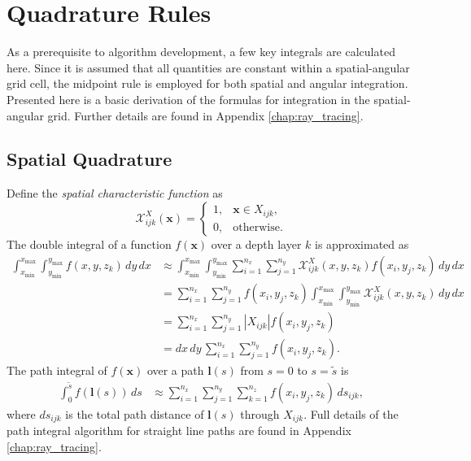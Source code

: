 \documentclass[ms,cpyr,lof,lot]{uathesis}
\newcommand\xmin{{x_{\min}}}
\newcommand\xmax{{x_{\max}}}
\newcommand\ymin{{y_{\min}}}
\newcommand\ymax{{y_{\max}}}
\newcommand\abs[1]{\left| #1 \right|}
\renewcommand\vec\bm
\providecommand{\DIFaddend}{} %
\DeclareRobustCommand{\DIFaddend}{\DIFOaddend \let\includegraphics\DIFOincludegraphics} %
\begin{document}
\DIFaddend \section{Quadrature Rules}
As a prerequisite to algorithm development, a few key integrals are calculated here.
Since it is assumed that all quantities are constant within a spatial-angular grid cell,
the midpoint rule is employed for both spatial and angular integration.
Presented here is a basic derivation of the formulas for integration in the spatial-angular grid.
Further details are found in Appendix \ref{chap:ray_tracing}.

\subsection{Spatial Quadrature}
Define the \textit{spatial characteristic function} as
\begin{equation*}
  \mathcal{X}^X_{ijk}(\vec{x}) = \begin{cases}
    1, & \vec{x} \in X_{ijk}, \\
    0, & \mbox{otherwise}.
  \end{cases}
\end{equation*}
The double integral of a function $f(\vec{x})$ over a depth layer $k$ is approximated as
\begin{align*}
  \int_\xmin^\xmax\int_\ymin^\ymax f(x, y, z_k)\, dy\, dx &\approx \int_\xmin^\xmax \int_\ymin^\ymax \sum_{i=1}^{n_x}\sum_{j=1}^{n_y} \mathcal{X}^X_{ijk}(x,y,z_k) f(x_i, y_j, z_k)\, dy\, dx \\
  &= \sum_{i=1}^{n_x}\sum_{j=1}^{n_y} f(x_i, y_j, z_k) \int_\xmin^\xmax \int_\ymin^\ymax \mathcal{X}^X_{ijk}(x,y,z_k) \, dy\, dx \\
  &= \sum_{i=1}^{n_x}\sum_{j=1}^{n_y} \abs{X_{ijk}} f(x_i, y_j, z_k) \\
  &= dx\, dy\, \sum_{i=1}^{n_x}\sum_{j=1}^{n_y} f(x_i, y_j, z_k).
\end{align*}
The path integral of $f(\vec{x})$ over a path $\vec{l}(s)$ from $s=0$ to $s=\tilde{s}$ is
\begin{align*}
  \int_0^{\tilde{s}} f(\vec{l}(s))\, ds &\approx \sum_{i=1}^{n_x}\sum_{j=1}^{n_y}\sum_{k=1}^{n_z} f(x_i, y_j, z_k)\, ds_{ijk},
\end{align*}
where $ds_{ijk}$ is the total path distance of $\vec{l}(s)$ through $X_{ijk}$.
Full details of the path integral algorithm for straight line paths are found in Appendix \ref{chap:ray_tracing}.
\end{document}
